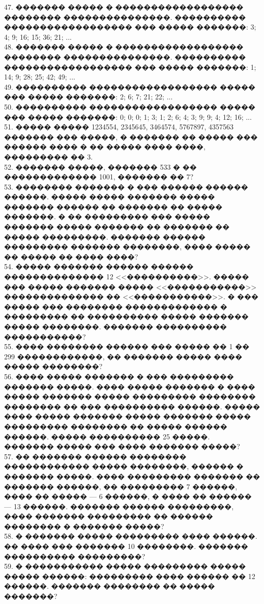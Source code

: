 \documentclass[12pt]{article}
\begin{document}
47. ������� ����� � ������������������ �������� ���������������. ���������� ������������������ ��� ����� �������: 3; 4; 9; 16; 15; 36; 21; ...\\
48. ������� ����� � ������������������ �������� ���������������. ���������� ������������������ ��� ����� �������: 1; 14; 9; 28; 25; 42; 49; ...\\
49. ���������� ������������������ ����� ��� ����� �������: 2; 6; 7; 21; 22; ...\\
50. ���������� ������������������ ����� ��� ����� �������: 0; 0; 0; 1; 3; 1; 2; 6; 4; 3; 9; 9; 4; 12; 16; ...\\
51. ����� ����� 1234554, 2345645, 3464574, 5767897, 4357563 ������� ��� �����, � ������� �� ����� ��� ������ ���� � �� ����� ���� ����, ��������� �� 3.\\
52. ������� �����, ������� 533 � �� ������������� 1001, ������� �� 7?\\
53. �������� ������� � ��� ������ ������ ������. ����� ����� ������� ����� ������� ������ �� ������� �� ����� �������. � �� ��������� ��� ����� ������� ����� ������� �� ������� �� ����� ���������. ������� ������ ��������� ������� ��������, ���� ����� �� ����� �� ���� ����?\\
54. ����� ������� ������ ������ �������������� 12 <<����������>>. ����� ��� ����� ������� ����� <<�����������>> �������������� �� <<�����������>>. � ��� ����� ��� �������� ������������� � ��������� �� ���������� ����� ������� ����� ��������. ������� ���������� �����������?\\
55. ���� �������� ������ ��� ����� �� 1 �� 299 ������������, �� ������� ����� ���� ����� ��������?\\
56. ���� ����� ������� � ��� ��������� ������� �����. ���� ����� ������� � ���� ����� ������� ����� ��������� �������� �������� �� ��� ���������� ������. ����� ���� ����� ������� ����� ������� ����� ��������� �������� �� ����� ������ ������. ����� ���������� 25 �����. ������� ����� ��� ���� ������� �����?\\
57. �� ������� ������ �������� ������������ ����� ��������, ������ � ������� �����. ���� ��������� ������� �� ������� ������, �� ��������� 7 ������, ���� �� ����� --- 6 ������, � ���� �� ������ --- 13 ������. ������� ������ ���������, ���� ������� ��������� �� ������ �������� � ������� �����?\\
58. � ������� ����� ��������� ���� ������. �� ���� ��� ������� 10 ��������. ������� ���������� ���������?\\
59. � ����������� ����� ��������� ����� ����� ������: ��������� ���� ������ �� 12 ������. ������� �������� �� ����� �������?\\
\end{document}
